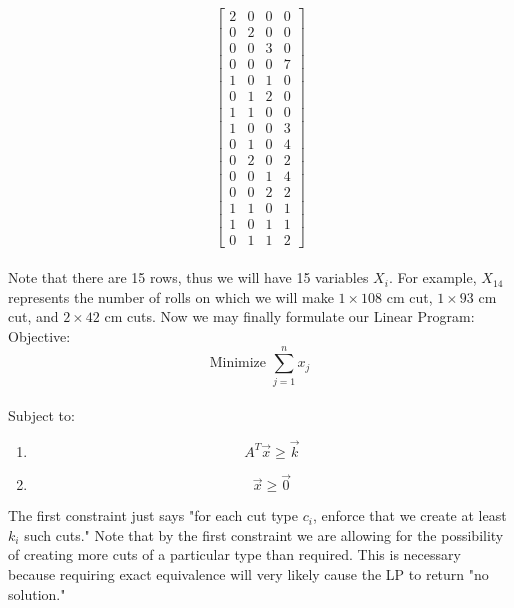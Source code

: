 \documentclass[10pt, letterpaper, twosided]{article}
\begin{document}
\[
\begin{bmatrix}
	2 & 0 & 0 & 0 \\
	0 & 2 & 0 & 0 \\
	0 & 0 & 3 & 0 \\
	0 & 0 & 0 & 7 \\
	1 & 0 & 1 & 0 \\
	0 & 1 & 2 & 0 \\
	1 & 1 & 0 & 0 \\
	1 & 0 & 0 & 3 \\
	0 & 1 & 0 & 4 \\
	0 & 2 & 0 & 2 \\
	0 & 0 & 1 & 4 \\
	0 & 0 & 2 & 2 \\
	1 & 1 & 0 & 1 \\
	1 & 0 & 1 & 1 \\
	0 & 1 & 1 & 2
\end{bmatrix}
\]\\

Note that there are 15 rows, thus we will have 15 variables $X_i$.  For example, $X_{14}$ represents the number of rolls
on which we will make $1 \times 108$ cm cut, $1 \times 93$ cm cut, and $2 \times 42$ cm cuts.
Now we may finally formulate our Linear Program:\\

Objective: $$\text{Minimize } \sum\limits_{j=1}^n x_j$$\\

Subject to:\\
\begin{enumerate}[label=(\roman*)]
\item $$A^T\vec{x} \geq \vec{k}$$
\item $$\vec{x} \geq \vec{0}$$
\end{enumerate}
The first constraint just says "for each cut type $c_i$, enforce that we create at least $k_i$ such cuts." Note that by the first constraint we are allowing for the possibility of creating more cuts of a particular type than required.  This is necessary because requiring exact equivalence will very likely cause the LP to return "no solution."  

\newpage
\end{document}
